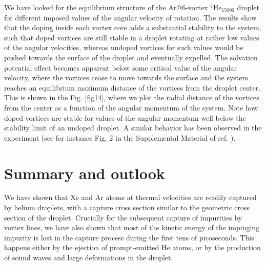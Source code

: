 We have looked for the equilibrium structure of the Ar@6-vortex $^4$He$_{15000}$ droplet
for different imposed values of the angular velocity
of rotation. The results show that the doping inside each vortex core
adds a substantial stability to the system, such that doped vortices are still 
stable in a droplet rotating at rather low 
values of the angular velocities, whereas undoped vortices
for such values would be pushed towards the surface of the
droplet and eventually expelled.
The solvation potential effect becomes
apparent below some critical 
value of the angular velocity, where the vortices
cease to move towards the surface and the 
system reaches an equilibrium maximum distance
of the vortices from the droplet center.
This is shown in the  Fig. \ref{fig14}, 
where we plot the radial distance of the vortices
from the center as a function of the angular momentum
of the system.
Note how doped vortices are stable for values
of the angular momentum well below the stability 
limit of an undoped droplet.
A similar behavior has been observed in the experiment (see for instance Fig. 2 in the
Supplemental Material of ref. \cite{Jon16}).


\section{Summary and outlook}


We have shown
that Xe and Ar atoms at thermal velocities are readily captured by helium droplets, with a capture cross section similar to
 the geometric cross section of the droplet. Crucially for the subsequent capture of impurities by vortex lines,
we have also shown that most of the kinetic energy of the impinging impurity is lost in the capture process during the first tens of picoseconds. This happens either by the ejection of
 prompt-emitted He atoms, or by  the production of sound waves and large deformations in the droplet. 
 

